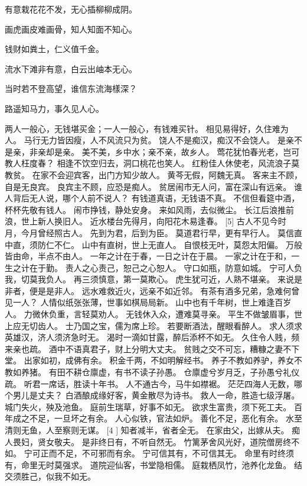 \documentclass[12pt,UTF8]{ctexbook}
\begin{document}
有意栽花花不发，无心插柳柳成阴。

画虎画皮难画骨，知人知面不知心。

钱财如粪土，仁义值千金。

流水下滩非有意，白云出岫本无心。

当时若不登高望，谁信东流海樣深？

路遥知马力，事久见人心。

两人一般心，无钱堪买金；一人一般心，有钱难买针。
相见易得好，久住难为人。
马行无力皆因瘦，人不风流只为贫。
饶人不是痴汉，痴汉不会饶人。
是亲不是亲，非亲却是亲。
美不美，乡中水；亲不亲，故乡人。
莺花犹怕春光老，岂可教人枉度春？
相逢不饮空归去，洞口桃花也笑人。
红粉佳人休使老，风流浪子莫教贫。
在家不会迎宾客，出门方知少故人。
黄芩无假，阿魏无真。
客来主不顾，自是无良宾。
良宾主不顾，应恐是痴人。
贫居闹市无人问，富在深山有远亲。
谁人背后无人说，哪个人前不说人？
有钱道真语，无钱语不真。
不信但看筵中酒，杯杯先敬有钱人。
闹市挣钱，静处安身。
来如风雨，去似微尘。
长江后浪推前浪，世上新人换旧人。
近水楼台先得月，向阳花木易逢春。 [5]
古人不见今时月，今月曾经照古人。
先到为君，后到为臣。
莫道君行早，更有早行人。
莫信直中直，须防仁不仁。
山中有直树，世上无直人。
自恨枝无叶，莫怨太阳偏。
万般皆由命，半点不由人。
一年之计在于春，一日之计在于晨。
一家之计在于和，一生之计在于勤。
责人之心责己，恕己之心恕人。
守口如瓶，防意如城。
宁可人负我，切莫我负人。
再三须慎意，第一莫欺心。
虎生犹可近，人熟不堪亲。
来说是非者，便是是非人。
远水难救近火，远亲不如近邻。
有茶有酒多兄弟，急难何曾见一人？
人情似纸张张薄，世事如棋局局新。
山中也有千年树，世上难逢百岁人。
力微休负重，言轻莫劝人。
无钱休入众，遭难莫寻亲。
平生不做皱眉事，世上应无切齿人。
士乃国之宝，儒为席上珍。
若要断酒法，醒眼看醉人。
求人须求英雄汉，济人须济急时无。
渴时一滴如甘露，醉后添杯不如无。
久住令人贱，频来亲也疏。
酒中不语真君子，财上分明大丈夫。
贫贱之交不可忘，糟糠之妻不下堂。
出家如初，成佛有余。
积金千两，不如明解经书。
养子不教如养驴，养女不教如养猪。
有田不耕仓廪虚，有书不读子孙愚。
仓廪虚兮岁月乏，子孙愚兮礼仪疏。
听君一席话，胜读十年书。
人不通古今，马牛如襟裾。
茫茫四海人无数，哪个男儿是丈夫？
白酒酿成缘好客，黄金散尽为诗书。
救人一命，胜造七级浮屠。
城门失火，殃及池鱼。
庭前生瑞草，好事不如无。
欲求生富贵，须下死工夫。
百年成之不足，一旦坏之有余。
人心似铁，官法如炉。
善化不足，恶化有余。
水至清则无鱼，人至察则无谋。 [4
]
知者减半，省者全无。
在家由父，出嫁从夫。
痴人畏妇，贤女敬夫。
是非终日有，不听自然无。
竹篱茅舍风光好，道院僧房终不如。
宁可正而不足，不可邪而有余。
宁可信其有，不可信其无。
命里有时终须有，命里无时莫强求。
道院迎仙客，书堂隐相儒。
庭栽栖凤竹，池养化龙鱼。
结交须胜己，似我不如无。
\end{document}
